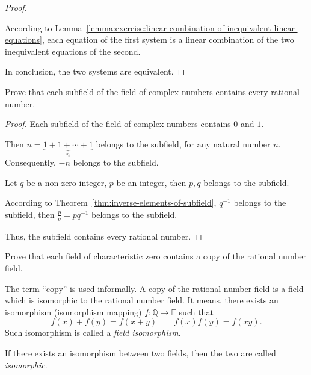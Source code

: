 \begin{proof}
\begin{enumerate}[label = \textbf{Case \arabic*.}, itemindent=1cm]
\begin{itemize}
                        According to Lemma~\ref{lemma:exercise:linear-combination-of-inequivalent-linear-equations}, each equation of the first system is a linear combination of the two inequivalent equations of the second.
              \end{itemize}
    \end{enumerate}

    In conclusion, the two systems are equivalent.
\end{proof}

\begin{exercise}
    Prove that each subfield of the field of complex numbers contains every rational number.
\end{exercise}

\begin{proof}
    Each subfield of the field of complex numbers contains $0$ and $1$.

    Then $n = \underbrace{1 + 1 + \cdots + 1}_{n}$ belongs to the subfield, for any natural number $n$. Consequently, $-n$ belongs to the subfield.

    Let $q$ be a non-zero integer, $p$ be an integer, then $p, q$ belongs to the subfield.

    According to Theorem~\ref{thm:inverse-elements-of-subfield}, $q^{-1}$ belongs to the subfield, then $\frac{p}{q} = pq^{-1}$ belongs to the subfield.

    Thus, the subfield contains every rational number.
\end{proof}

\begin{exercise}
    Prove that each field of characteristic zero contains a copy of the rational number field.
\end{exercise}

\begin{note}
    The term ``copy'' is used informally. A copy of the rational number field is a field which is isomorphic to the rational number field. It means, there exists an isomorphism (isomorphism mapping) $f: \mathbb{Q}\to\mathbb{F}$ such that
    \[
        f(x) + f(y) = f(x + y)\qquad f(x)f(y) = f(xy).
    \]
    Such isomorphism is called a \textit{field isomorphism}.

    If there exists an isomorphism between two fields, then the two are called \textit{isomorphic}.
\end{note}

